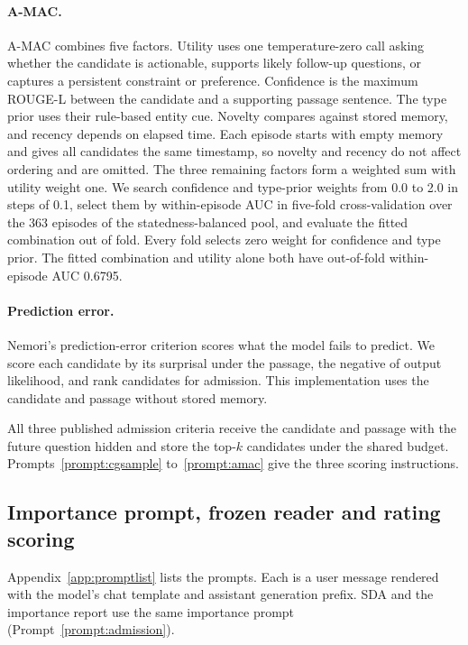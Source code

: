 \paragraph{A-MAC.}
A-MAC \citep{amac2026} combines five factors. Utility uses one temperature-zero call asking whether the candidate is actionable, supports likely follow-up questions, or captures a persistent constraint or preference. Confidence is the maximum ROUGE-L between the candidate and a supporting passage sentence. The type prior uses their rule-based entity cue. Novelty compares against stored memory, and recency depends on elapsed time. Each episode starts with empty memory and gives all candidates the same timestamp, so novelty and recency do not affect ordering and are omitted. The three remaining factors form a weighted sum with utility weight one. We search confidence and type-prior weights from 0.0 to 2.0 in steps of 0.1, select them by within-episode AUC in five-fold cross-validation over the 363 episodes of the statedness-balanced pool, and evaluate the fitted combination out of fold. Every fold selects zero weight for confidence and type prior. The fitted combination and utility alone both have out-of-fold within-episode AUC 0.6795.

\paragraph{Prediction error.}
Nemori's prediction-error criterion \citep{nemori2026} scores what the model fails to predict. We score each candidate by its surprisal under the passage, the negative of output likelihood, and rank candidates for admission. This implementation uses the candidate and passage without stored memory.

All three published admission criteria receive the candidate and passage with the future question hidden and store the top-$k$ candidates under the shared budget. Prompts~\ref{prompt:cgsample} to~\ref{prompt:amac} give the three scoring instructions.


\subsection{Importance prompt, frozen reader and rating scoring}
\label{app:prompts}

Appendix~\ref{app:promptlist} lists the prompts. Each is a user message rendered with the model's chat template and assistant generation prefix. SDA and the importance report use the same importance prompt (Prompt~\ref{prompt:admission}).


